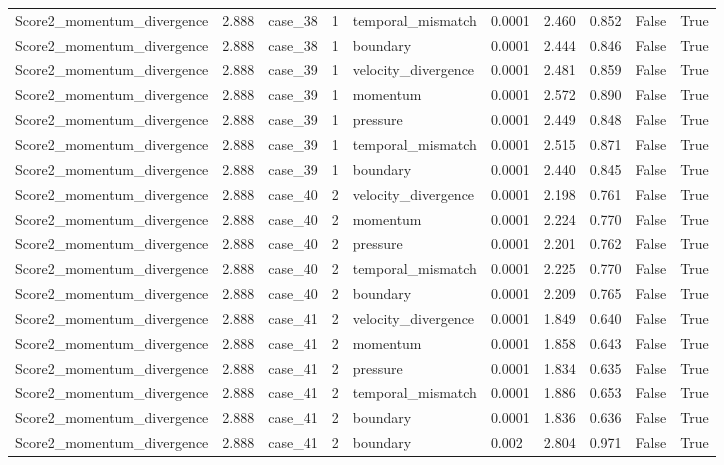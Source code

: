 \begin{longtable}{llllllllll}
Score2\_momentum\_divergence & 2.888 & case\_38 & 1 & temporal\_mismatch & 0.0001 & 2.460 & 0.852 & False & True \\
Score2\_momentum\_divergence & 2.888 & case\_38 & 1 & boundary & 0.0001 & 2.444 & 0.846 & False & True \\
Score2\_momentum\_divergence & 2.888 & case\_39 & 1 & velocity\_divergence & 0.0001 & 2.481 & 0.859 & False & True \\
Score2\_momentum\_divergence & 2.888 & case\_39 & 1 & momentum & 0.0001 & 2.572 & 0.890 & False & True \\
Score2\_momentum\_divergence & 2.888 & case\_39 & 1 & pressure & 0.0001 & 2.449 & 0.848 & False & True \\
Score2\_momentum\_divergence & 2.888 & case\_39 & 1 & temporal\_mismatch & 0.0001 & 2.515 & 0.871 & False & True \\
Score2\_momentum\_divergence & 2.888 & case\_39 & 1 & boundary & 0.0001 & 2.440 & 0.845 & False & True \\
Score2\_momentum\_divergence & 2.888 & case\_40 & 2 & velocity\_divergence & 0.0001 & 2.198 & 0.761 & False & True \\
Score2\_momentum\_divergence & 2.888 & case\_40 & 2 & momentum & 0.0001 & 2.224 & 0.770 & False & True \\
Score2\_momentum\_divergence & 2.888 & case\_40 & 2 & pressure & 0.0001 & 2.201 & 0.762 & False & True \\
Score2\_momentum\_divergence & 2.888 & case\_40 & 2 & temporal\_mismatch & 0.0001 & 2.225 & 0.770 & False & True \\
Score2\_momentum\_divergence & 2.888 & case\_40 & 2 & boundary & 0.0001 & 2.209 & 0.765 & False & True \\
Score2\_momentum\_divergence & 2.888 & case\_41 & 2 & velocity\_divergence & 0.0001 & 1.849 & 0.640 & False & True \\
Score2\_momentum\_divergence & 2.888 & case\_41 & 2 & momentum & 0.0001 & 1.858 & 0.643 & False & True \\
Score2\_momentum\_divergence & 2.888 & case\_41 & 2 & pressure & 0.0001 & 1.834 & 0.635 & False & True \\
Score2\_momentum\_divergence & 2.888 & case\_41 & 2 & temporal\_mismatch & 0.0001 & 1.886 & 0.653 & False & True \\
Score2\_momentum\_divergence & 2.888 & case\_41 & 2 & boundary & 0.0001 & 1.836 & 0.636 & False & True \\
Score2\_momentum\_divergence & 2.888 & case\_41 & 2 & boundary & 0.002 & 2.804 & 0.971 & False & True \\

\end{longtable}
